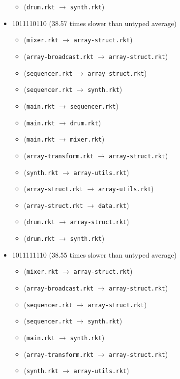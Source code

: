 \documentclass{article}
\newcommand{\mono}[1]{\texttt{#1}}
\begin{document}
\begin{itemize}
\begin{itemize}
  \item (\mono{drum.rkt} $\rightarrow$ \mono{synth.rkt})
  \end{itemize}
\item 1011110110 (38.57 times slower than untyped average)
  \begin{itemize}
  \item (\mono{mixer.rkt} $\rightarrow$ \mono{array-struct.rkt})
  \item (\mono{array-broadcast.rkt} $\rightarrow$ \mono{array-struct.rkt})
  \item (\mono{sequencer.rkt} $\rightarrow$ \mono{array-struct.rkt})
  \item (\mono{sequencer.rkt} $\rightarrow$ \mono{synth.rkt})
  \item (\mono{main.rkt} $\rightarrow$ \mono{sequencer.rkt})
  \item (\mono{main.rkt} $\rightarrow$ \mono{drum.rkt})
  \item (\mono{main.rkt} $\rightarrow$ \mono{mixer.rkt})
  \item (\mono{array-transform.rkt} $\rightarrow$ \mono{array-struct.rkt})
  \item (\mono{synth.rkt} $\rightarrow$ \mono{array-utils.rkt})
  \item (\mono{array-struct.rkt} $\rightarrow$ \mono{array-utils.rkt})
  \item (\mono{array-struct.rkt} $\rightarrow$ \mono{data.rkt})
  \item (\mono{drum.rkt} $\rightarrow$ \mono{array-struct.rkt})
  \item (\mono{drum.rkt} $\rightarrow$ \mono{synth.rkt})
  \end{itemize}
\item 1011111110 (38.55 times slower than untyped average)
  \begin{itemize}
  \item (\mono{mixer.rkt} $\rightarrow$ \mono{array-struct.rkt})
  \item (\mono{array-broadcast.rkt} $\rightarrow$ \mono{array-struct.rkt})
  \item (\mono{sequencer.rkt} $\rightarrow$ \mono{array-struct.rkt})
  \item (\mono{sequencer.rkt} $\rightarrow$ \mono{synth.rkt})
  \item (\mono{main.rkt} $\rightarrow$ \mono{synth.rkt})
  \item (\mono{array-transform.rkt} $\rightarrow$ \mono{array-struct.rkt})
  \item (\mono{synth.rkt} $\rightarrow$ \mono{array-utils.rkt})

\end{itemize}
\end{itemize}
\end{document}
